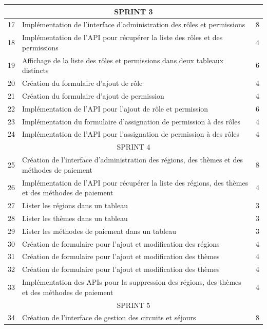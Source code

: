 \documentclass[12pt]{report}
\begin{document}
\begin{longtable}{|p{1cm}|p{7cm}|p{6cm}|}
						\hline
						\multicolumn{3}{|c|}{SPRINT 3}\\
						\hline
						17 & Implémentation de l'interface d'administration des rôles et permissions & 8\\
						\hline
						18 & Implémentation de l'API pour récupérer la liste des rôles et des permissions & 4\\
						\hline
						19 & Affichage de la liste des rôles et permissions dans deux tableaux distincts & 6\\
						\hline
						20 & Création du formulaire d'ajout de rôle & 4\\
						\hline
						21 & Création du formulaire d'ajout de permission & 4\\
						\hline
						22 & Implémentation de l'API pour l'ajout de rôle et permission & 6\\
						\hline
						23 & Implémentation du formulaire d'assignation de permission à des rôles & 4\\
						\hline
						24 & Implémentation de l'API pour l'assignation de permission à des rôles & 4\\
						\hline
						\multicolumn{3}{|c|}{SPRINT 4}\\
						\hline
						25 & Création de l'interface d'administration des régions, des thèmes et des méthodes de paiement & 8\\
						\hline
						26 & Implémentation de l'API pour récupérer la liste des régions, des thèmes et des méthodes de paiement & 4\\
						\hline
						27 & Lister les régions dans un tableau & 3\\
						\hline
						28 & Lister les thèmes dans un tableau & 3\\
						\hline
						29 & Lister les méthodes de paiement dans un tableau & 3\\
						\hline
						30 & Création de formulaire pour l'ajout et modification des régions & 4\\
						\hline
						31 & Création de formulaire pour l'ajout et modification des thèmes & 4\\
						\hline
						32 & Création de formulaire pour l'ajout et modification des thèmes & 4\\
						\hline
						33 & Implémentation des APIs pour la suppression des régions, des thèmes et des méthodes de paiement & 4\\
						\hline
						\multicolumn{3}{|c|}{SPRINT 5}\\
						\hline
						34 & Création de l'interface de gestion des circuits et séjours & 8\\

\end{longtable}
\end{document}
